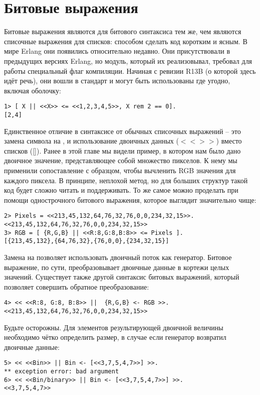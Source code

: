 \section{Битовые выражения}
Битовые выражения являются для битового синтаксиса тем же, чем являются списочные выражения для списков: способом сделать код коротким и ясным.
В мире Erlang они появились относительно недавно.
Они присутствовали в предыдущих версиях Erlang, но модуль, который их реализовывал, требовал для работы специальный флаг компиляции.
Начиная с ревизии R13B (о которой здесь идёт речь), они вошли в стандарт и могут быть использованы где угодно, включая оболочку:
\begin{lstlisting}[style=repl]
1> [ X || <<X>> <= <<1,2,3,4,5>>, X rem 2 == 0].    
[2,4]
\end{lstlisting}

Единственное отличие в синтаксисе от обычных списочных выражений \--- это замена символа \ops{$<-$} на \ops{$<=$}, и использование двоичных данных ($<< >>$) вместо списков ([]).
Ранее в этой главе мы видели пример, в котором нам было дано двоичное значение, представляющее собой множество пикселов.
К нему мы применили сопоставление с образцом, чтобы вычленить RGB значения для каждого пиксела.
В принципе, неплохой метод, но для больших структур такой код будет сложно читать и поддерживать.
То же самое можно проделать при помощи однострочного битового выражения, которое выглядит значительно чище:
\begin{lstlisting}[style=repl]
2> Pixels = <<213,45,132,64,76,32,76,0,0,234,32,15>>.
<<213,45,132,64,76,32,76,0,0,234,32,15>>
3> RGB = [ {R,G,B} || <<R:8,G:8,B:8>> <= Pixels ].
[{213,45,132},{64,76,32},{76,0,0},{234,32,15}]
\end{lstlisting}

Замена \ops{$<-$} на \ops{$<=$} позволяет использовать двоичный поток как генератор.
Битовое выражение, по сути, преобразовывает двоичные данные в кортежи целых значений.
Существует также другой синтаксис битовых выражений, который позволяет совершить обратное преобразование:
\begin{lstlisting}[style=repl]
4> << <<R:8, G:8, B:8>> ||  {R,G,B} <- RGB >>.
<<213,45,132,64,76,32,76,0,0,234,32,15>>
\end{lstlisting}

Будьте осторожны.
Для элементов результирующей двоичной величины необходимо чётко определить размер, в случае если генератор возвратил двоичные данные:
\begin{lstlisting}[style=repl]
5> << <<Bin>> || Bin <- [<<3,7,5,4,7>>] >>.
** exception error: bad argument
6> << <<Bin/binary>> || Bin <- [<<3,7,5,4,7>>] >>. 
<<3,7,5,4,7>>
\end{lstlisting}

